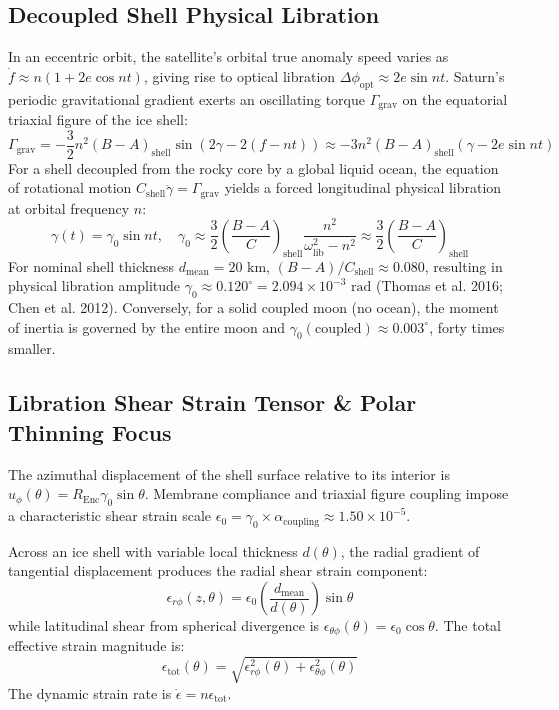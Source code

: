 \documentclass[11pt,a4paper]{article}
\begin{document}
\subsection{Decoupled Shell Physical Libration}
In an eccentric orbit, the satellite's orbital true anomaly speed varies as $\dot{f} \approx n(1 + 2e\cos nt)$, giving rise to optical libration $\Delta \phi_{\text{opt}} \approx 2e\sin nt$. Saturn's periodic gravitational gradient exerts an oscillating torque $\Gamma_{\text{grav}}$ on the equatorial triaxial figure of the ice shell:
\begin{equation}
\Gamma_{\text{grav}} = -\frac{3}{2} n^2 (B - A)_{\text{shell}} \sin(2\gamma - 2(f - nt)) \approx -3 n^2 (B - A)_{\text{shell}} (\gamma - 2e\sin nt)
\end{equation}
For a shell decoupled from the rocky core by a global liquid ocean, the equation of rotational motion $C_{\text{shell}} \ddot{\gamma} = \Gamma_{\text{grav}}$ yields a forced longitudinal physical libration at orbital frequency $n$:
\begin{equation}
\gamma(t) = \gamma_0 \sin nt, \quad \gamma_0 \approx \frac{3}{2} \left(\frac{B - A}{C}\right)_{\text{shell}} \frac{n^2}{\omega_{\text{lib}}^2 - n^2} \approx \frac{3}{2} \left(\frac{B - A}{C}\right)_{\text{shell}}
\end{equation}
For nominal shell thickness $d_{\text{mean}} = 20\text{ km}$, $(B-A)/C_{\text{shell}} \approx 0.080$, resulting in physical libration amplitude $\gamma_0 \approx 0.120^\circ = 2.094 \times 10^{-3}\text{ rad}$ (Thomas et al. 2016; Chen et al. 2012). Conversely, for a solid coupled moon (no ocean), the moment of inertia is governed by the entire moon and $\gamma_0(\text{coupled}) \approx 0.003^\circ$, forty times smaller.

\subsection{Libration Shear Strain Tensor \& Polar Thinning Focus}
The azimuthal displacement of the shell surface relative to its interior is $u_\phi(\theta) = R_{\text{Enc}} \gamma_0 \sin\theta$. Membrane compliance and triaxial figure coupling impose a characteristic shear strain scale $\epsilon_0 = \gamma_0 \times \alpha_{\text{coupling}} \approx 1.50 \times 10^{-5}$.

Across an ice shell with variable local thickness $d(\theta)$, the radial gradient of tangential displacement produces the radial shear strain component:
\begin{equation}
\epsilon_{r\phi}(z, \theta) = \epsilon_0 \left( \frac{d_{\text{mean}}}{d(\theta)} \right) \sin\theta
\end{equation}
while latitudinal shear from spherical divergence is $\epsilon_{\theta\phi}(\theta) = \epsilon_0 \cos\theta$. The total effective strain magnitude is:
\begin{equation}
\epsilon_{\text{tot}}(\theta) = \sqrt{\epsilon_{r\phi}^2(\theta) + \epsilon_{\theta\phi}^2(\theta)}
\end{equation}
The dynamic strain rate is $\dot{\epsilon} = n \epsilon_{\text{tot}}$.
\end{document}
